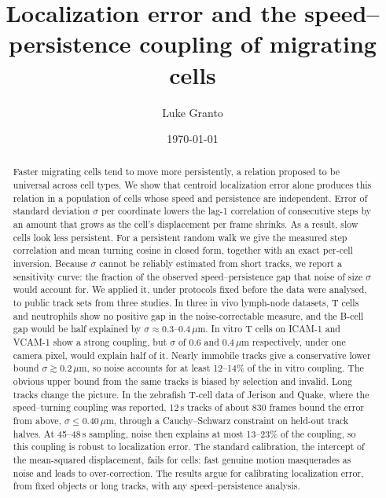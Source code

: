 \documentclass[aps,pre,10pt,twocolumn,superscriptaddress,amsmath,amssymb,floatfix]{revtex4-2}
\begin{document}
\title{Localization error and the speed--persistence coupling of migrating cells}

\author{Luke Granto}

\date{\today}

\begin{abstract}
Faster migrating cells tend to move more persistently, a relation proposed to be universal across cell types. We show that centroid localization error alone produces this relation in a population of cells whose speed and persistence are independent. Error of standard deviation $\sigma$ per coordinate lowers the lag-1 correlation of consecutive steps by an amount that grows as the cell's displacement per frame shrinks. As a result, slow cells look less persistent. For a persistent random walk we give the measured step correlation and mean turning cosine in closed form, together with an exact per-cell inversion. Because $\sigma$ cannot be reliably estimated from short tracks, we report a sensitivity curve: the fraction of the observed speed--persistence gap that noise of size $\sigma$ would account for. We applied it, under protocols fixed before the data were analysed, to public track sets from three studies. In three in vivo lymph-node datasets, T cells and neutrophils show no positive gap in the noise-correctable measure, and the B-cell gap would be half explained by $\sigma\approx0.3$--0.4\,$\mu$m. In vitro T cells on ICAM-1 and VCAM-1 show a strong coupling, but $\sigma$ of 0.6 and 0.4\,$\mu$m respectively, under one camera pixel, would explain half of it. Nearly immobile tracks give a conservative lower bound $\sigma\gtrsim0.2$\,$\mu$m, so noise accounts for at least 12--14\% of the in vitro coupling. The obvious upper bound from the same tracks is biased by selection and invalid. Long tracks change the picture. In the zebrafish T-cell data of Jerison and Quake, where the speed--turning coupling was reported, 12\,s tracks of about 830 frames bound the error from above, $\sigma\le0.40$\,$\mu$m, through a Cauchy--Schwarz constraint on held-out track halves. At 45--48\,s sampling, noise then explains at most 13--23\% of the coupling, so this coupling is robust to localization error. The standard calibration, the intercept of the mean-squared displacement, fails for cells: fast genuine motion masquerades as noise and leads to over-correction. The results argue for calibrating localization error, from fixed objects or long tracks, with any speed--persistence analysis.
\end{abstract}
\end{document}
